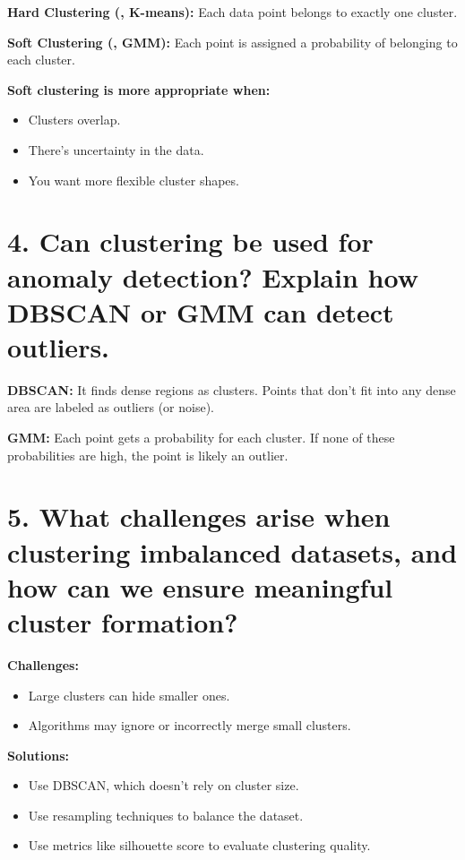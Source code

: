 \documentclass{article}
\begin{document}
\textbf{Hard Clustering (, K-means):} Each data point belongs to exactly one cluster.

\textbf{Soft Clustering (, GMM):} Each point is assigned a probability of belonging to each cluster.

\textbf{Soft clustering is more appropriate when:}

\begin{itemize}
  \item Clusters overlap.
  \item There’s uncertainty in the data.
  \item You want more flexible cluster shapes.
\end{itemize}

\section*{4.
Can clustering be used for anomaly detection? Explain how DBSCAN or GMM can detect outliers.}



\textbf{DBSCAN:}  
It finds dense regions as clusters. Points that don’t fit into any dense area are labeled as outliers (or noise).

\textbf{GMM:}  
Each point gets a probability for each cluster. If none of these probabilities are high, the point is likely an outlier.

\section*{5.
What challenges arise when clustering imbalanced datasets, and how can we ensure meaningful cluster formation?
}


\textbf{Challenges:}
\begin{itemize}
  \item Large clusters can hide smaller ones.
  \item Algorithms may ignore or incorrectly merge small clusters.
\end{itemize}

\textbf{Solutions:}
\begin{itemize}
  \item Use DBSCAN, which doesn’t rely on cluster size.
  \item Use resampling techniques to balance the dataset.
  \item Use metrics like silhouette score to evaluate clustering quality.
\end{itemize}
\end{document}
